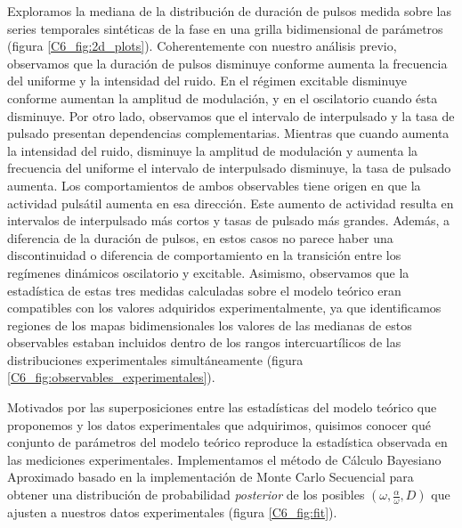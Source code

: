 \documentclass[./main.tex]{subfiles}
\begin{document}
Exploramos la mediana de la distribución de duración de pulsos medida sobre las series temporales sintéticas de la fase en una grilla bidimensional de parámetros (figura \ref{C6_fig:2d_plots}). Coherentemente con nuestro análisis previo, observamos que la duración de pulsos disminuye conforme aumenta la frecuencia del uniforme y la intensidad del ruido. En el régimen excitable disminuye conforme aumentan la amplitud de modulación, y en el oscilatorio cuando ésta disminuye. Por otro lado, observamos que el intervalo de interpulsado y la tasa de pulsado presentan dependencias complementarias.  Mientras que cuando aumenta la intensidad del ruido, disminuye la amplitud de modulación y aumenta la frecuencia del uniforme el intervalo de interpulsado disminuye, la tasa de pulsado aumenta. Los comportamientos de ambos observables tiene origen en que la actividad pulsátil aumenta en esa dirección. Este aumento de actividad resulta en intervalos de interpulsado más cortos y tasas de pulsado más grandes. Además, a diferencia de la duración de pulsos, en estos casos no parece haber una discontinuidad o diferencia de comportamiento en la transición entre los regímenes dinámicos oscilatorio y excitable. Asimismo, observamos que la estadística de estas tres medidas calculadas sobre el modelo teórico eran compatibles con los valores adquiridos experimentalmente, ya que identificamos regiones de los mapas bidimensionales los valores de las medianas de estos observables estaban incluidos dentro de los rangos intercuartílicos de las distribuciones experimentales simultáneamente (figura \ref{C6_fig:observables_experimentales}). 


Motivados por las superposiciones entre las estadísticas del modelo teórico que proponemos y los datos experimentales que adquirimos, quisimos conocer qué conjunto de parámetros del modelo teórico reproduce la estadística observada en las mediciones experimentales. Implementamos el método de Cálculo Bayesiano Aproximado basado en la implementación de Monte Carlo Secuencial para obtener una distribución de probabilidad \textit{posterior} de los posibles $(\omega,\frac{\alpha}{\omega},D)$ que ajusten a nuestros datos experimentales (figura  \ref{C6_fig:fit}). 
\end{document}

